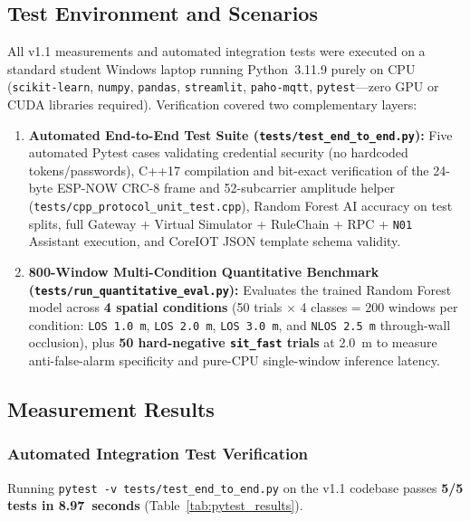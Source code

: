\documentclass{hcmut-report}
\begin{document}
\subsection{Test Environment and Scenarios}
All v1.1 measurements and automated integration tests were executed on a standard student Windows laptop running Python~3.11.9 purely on CPU (\texttt{scikit-learn}, \texttt{numpy}, \texttt{pandas}, \texttt{streamlit}, \texttt{paho-mqtt}, \texttt{pytest}—zero GPU or CUDA libraries required). Verification covered two complementary layers:
\begin{enumerate}
  \item \textbf{Automated End-to-End Test Suite (\texttt{tests/test\_end\_to\_end.py}):} Five automated Pytest cases validating credential security (no hardcoded tokens/passwords), C++17 compilation and bit-exact verification of the 24-byte ESP-NOW CRC-8 frame and 52-subcarrier amplitude helper (\texttt{tests/cpp\_protocol\_unit\_test.cpp}), Random Forest AI accuracy on test splits, full Gateway + Virtual Simulator + RuleChain + RPC + \texttt{N01} Assistant execution, and CoreIOT JSON template schema validity.
  \item \textbf{800-Window Multi-Condition Quantitative Benchmark (\texttt{tests/run\_quantitative\_eval.py}):} Evaluates the trained Random Forest model across \textbf{4 spatial conditions} (50 trials $\times$ 4 classes = 200 windows per condition: \texttt{LOS 1.0~m}, \texttt{LOS 2.0~m}, \texttt{LOS 3.0~m}, and \texttt{NLOS 2.5~m} through-wall occlusion), plus \textbf{50 hard-negative \texttt{sit\_fast} trials} at 2.0~m to measure anti-false-alarm specificity and pure-CPU single-window inference latency.
\end{enumerate}

\subsection{Measurement Results}

\subsubsection{Automated Integration Test Verification}
Running \texttt{pytest -v tests/test\_end\_to\_end.py} on the v1.1 codebase passes \textbf{5/5 tests in 8.97~seconds} (Table~\ref{tab:pytest_results}).
\end{document}
